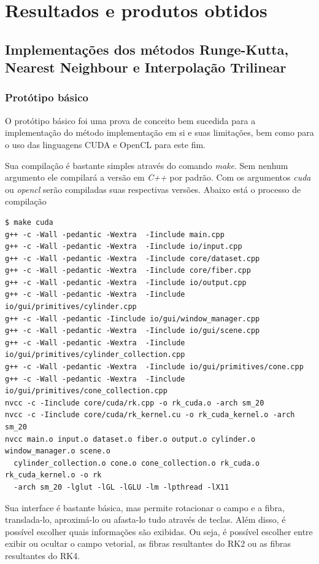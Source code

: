 \chapter{Resultados e produtos obtidos}

\section{Implementações dos métodos Runge-Kutta, Nearest Neighbour e Interpolação Trilinear}
  \subsection{Protótipo básico}
  O protótipo básico foi uma prova de conceito bem sucedida para a implementação do método implementação em si e suas limitações, bem como para o uso das linguagens CUDA e OpenCL para este fim.
  
  Sua compilação é bastante simples através do comando \textit{make}. Sem nenhum argumento ele compilará a versão em \textit{C++} por padrão. Com os argumentos \textit{cuda} ou \textit{opencl} serão compiladas suas respectivas versões. Abaixo está o processo de compilação
  
  {\scriptsize
  \begin{verbatim}
$ make cuda
g++ -c -Wall -pedantic -Wextra  -Iinclude main.cpp
g++ -c -Wall -pedantic -Wextra  -Iinclude io/input.cpp
g++ -c -Wall -pedantic -Wextra  -Iinclude core/dataset.cpp
g++ -c -Wall -pedantic -Wextra  -Iinclude core/fiber.cpp
g++ -c -Wall -pedantic -Wextra  -Iinclude io/output.cpp
g++ -c -Wall -pedantic -Wextra  -Iinclude io/gui/primitives/cylinder.cpp
g++ -c -Wall -pedantic -Iinclude io/gui/window_manager.cpp
g++ -c -Wall -pedantic -Wextra  -Iinclude io/gui/scene.cpp
g++ -c -Wall -pedantic -Wextra  -Iinclude io/gui/primitives/cylinder_collection.cpp
g++ -c -Wall -pedantic -Wextra  -Iinclude io/gui/primitives/cone.cpp
g++ -c -Wall -pedantic -Wextra  -Iinclude io/gui/primitives/cone_collection.cpp
nvcc -c -Iinclude core/cuda/rk.cpp -o rk_cuda.o -arch sm_20
nvcc -c -Iinclude core/cuda/rk_kernel.cu -o rk_cuda_kernel.o -arch sm_20
nvcc main.o input.o dataset.o fiber.o output.o cylinder.o window_manager.o scene.o
  cylinder_collection.o cone.o cone_collection.o rk_cuda.o rk_cuda_kernel.o -o rk
  -arch sm_20 -lglut -lGL -lGLU -lm -lpthread -lX11
  \end{verbatim}
  }
  
  \newpage
  Sua interface é bastante básica, mas permite rotacionar o campo e a fibra, translada-lo, aproximá-lo ou afasta-lo tudo através de teclas. Além disso, é possível escolher quais informações são exibidas. Ou seja, é possível escolher entre exibir ou ocultar o campo vetorial, as fibras resultantes do RK2 ou as fibras resultantes do RK4.
  
